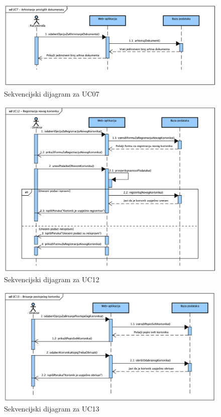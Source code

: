 					\begin{figure}[H]
						\includegraphics[width=\textwidth]{slike/Sequence_UC07.png}
						\caption{Sekvencijski dijagram za UC07}
						\label{fig:sequence_UC07}
					\end{figure}

					\begin{figure}[H]
						\includegraphics[width=\textwidth]{slike/Sequence_UC12.png}
						\caption{Sekvencijski dijagram za UC12}
						\label{fig:sequence_UC12}
					\end{figure}

					\begin{figure}[H]
						\includegraphics[width=\textwidth]{slike/Sequence_UC13.png}
						\caption{Sekvencijski dijagram za UC13}
						\label{fig:sequence_UC13}
					\end{figure}
			\eject{}
	
